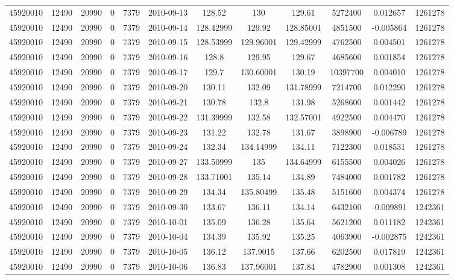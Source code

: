 \documentclass[12 pt]{article}
\begin{document}
\begin{flushleft}
\begin{table}[h]
\begin{tabular}{c c c c c c c c c c c c }
45920010 & 12490 & 20990 & 0 & 7379 & 2010-09-13 & 128.52 & 130 & 129.61 & 5272400 & 0.012657 & 1261278\\
45920010 & 12490 & 20990 & 0 & 7379 & 2010-09-14 & 128.42999 & 129.92 & 128.85001 & 4851500 & -0.005864 & 1261278\\
45920010 & 12490 & 20990 & 0 & 7379 & 2010-09-15 & 128.53999 & 129.96001 & 129.42999 & 4762500 & 0.004501 & 1261278\\
45920010 & 12490 & 20990 & 0 & 7379 & 2010-09-16 & 128.8 & 129.95 & 129.67 & 4685600 & 0.001854 & 1261278\\
45920010 & 12490 & 20990 & 0 & 7379 & 2010-09-17 & 129.7 & 130.60001 & 130.19 & 10397700 & 0.004010 & 1261278\\
45920010 & 12490 & 20990 & 0 & 7379 & 2010-09-20 & 130.11 & 132.09 & 131.78999 & 7214700 & 0.012290 & 1261278\\
45920010 & 12490 & 20990 & 0 & 7379 & 2010-09-21 & 130.78 & 132.8 & 131.98 & 5268600 & 0.001442 & 1261278\\
45920010 & 12490 & 20990 & 0 & 7379 & 2010-09-22 & 131.39999 & 132.58 & 132.57001 & 4922500 & 0.004470 & 1261278\\
45920010 & 12490 & 20990 & 0 & 7379 & 2010-09-23 & 131.22 & 132.78 & 131.67 & 3898900 & -0.006789 & 1261278\\
45920010 & 12490 & 20990 & 0 & 7379 & 2010-09-24 & 132.34 & 134.14999 & 134.11 & 7122300 & 0.018531 & 1261278\\
45920010 & 12490 & 20990 & 0 & 7379 & 2010-09-27 & 133.50999 & 135 & 134.64999 & 6155500 & 0.004026 & 1261278\\
45920010 & 12490 & 20990 & 0 & 7379 & 2010-09-28 & 133.71001 & 135.14 & 134.89 & 7484000 & 0.001782 & 1261278\\
45920010 & 12490 & 20990 & 0 & 7379 & 2010-09-29 & 134.34 & 135.80499 & 135.48 & 5151600 & 0.004374 & 1261278\\
45920010 & 12490 & 20990 & 0 & 7379 & 2010-09-30 & 133.67 & 136.11 & 134.14 & 6432100 & -0.009891 & 1242361\\
45920010 & 12490 & 20990 & 0 & 7379 & 2010-10-01 & 135.09 & 136.28 & 135.64 & 5621200 & 0.011182 & 1242361\\
45920010 & 12490 & 20990 & 0 & 7379 & 2010-10-04 & 134.39 & 135.92 & 135.25 & 4063900 & -0.002875 & 1242361\\
45920010 & 12490 & 20990 & 0 & 7379 & 2010-10-05 & 136.12 & 137.9015 & 137.66 & 6202500 & 0.017819 & 1242361\\
45920010 & 12490 & 20990 & 0 & 7379 & 2010-10-06 & 136.83 & 137.96001 & 137.84 & 4782900 & 0.001308 & 1242361\\

\end{tabular}
\end{table}
\end{flushleft}
\end{document}
